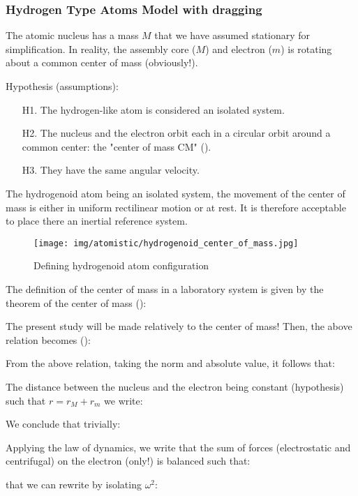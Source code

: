 	\subsubsection{Hydrogen Type Atoms Model with dragging}
	
	The atomic nucleus has a mass $M$ that we have assumed stationary for simplification. In reality, the assembly core ($M$) and electron ($m$) is rotating about a common center of mass (obviously!).
	
	Hypothesis (assumptions):
	\begin{enumerate}
		\item[H1.] The hydrogen-like atom is considered an isolated system.
	
		\item[H2.] The nucleus and the electron orbit each in a circular orbit around a common center: the "center of mass CM" ().

		\item[H3.] They have the same angular velocity.
		\end{enumerate}
	The hydrogenoid atom being an isolated system, the movement of the center of mass is either in uniform rectilinear motion or at rest. It is therefore acceptable to place there an inertial reference system.
	\begin{figure}[H]
		\centering
		\texttt{[image: img/atomistic/hydrogenoid\_center\_of\_mass.jpg]}
		\caption{Defining hydrogenoid atom configuration}
	\end{figure}
	The definition of the center of mass in a laboratory system is given by the theorem of the center of mass ():
	
The present study will be made relatively to the center of mass! Then, the above relation becomes ():
	
From the above relation, taking the norm and absolute value, it follows that:
	
The distance between the nucleus and the electron being constant (hypothesis) such that $r=r_M+r_m$ we write:
	
We conclude that trivially:
	
	Applying the law of dynamics, we write that the sum of forces (electrostatic and centrifugal) on the electron (only!) is balanced such that:
	
that we can rewrite by isolating $\omega^2$:
	
